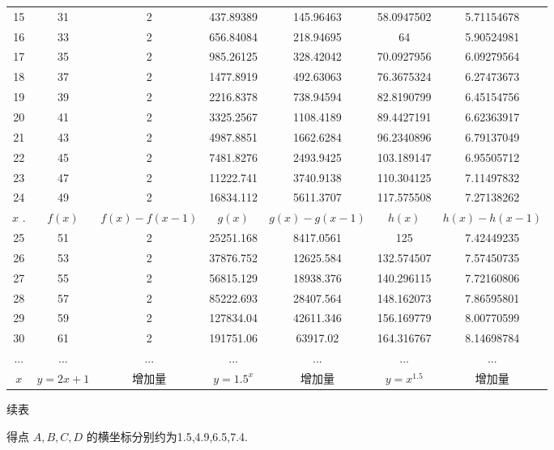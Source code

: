 \documentclass[10pt]{article}
\begin{document}
\begin{center}
{\begin{tabular}{|c|c|c|c|c|c|c|}
\cline{1-7}
15 & 31 & 2 & 437.89389 & 145.96463 & 58.0947502 & 5.71154678 \\
\cline{1-7}
16 & 33 & 2 & 656.84084 & 218.94695 & 64 & 5.90524981 \\
\cline{1-7}
17 & 35 & 2 & 985.26125 & 328.42042 & 70.0927956 & 6.09279564 \\
\cline{1-7}
18 & 37 & 2 & 1477.8919 & 492.63063 & 76.3675324 & 6.27473673 \\
\cline{1-7}
19 & 39 & 2 & 2216.8378 & 738.94594 & 82.8190799 & 6.45154756 \\
\cline{1-7}
20 & 41 & 2 & 3325.2567 & 1108.4189 & 89.4427191 & 6.62363917 \\
\cline{1-7}
21 & 43 & 2 & 4987.8851 & 1662.6284 & 96.2340896 & 6.79137049 \\
\cline{1-7}
22 & 45 & 2 & 7481.8276 & 2493.9425 & 103.189147 & 6.95505712 \\
\cline{1-7}
23 & 47 & 2 & 11222.741 & 3740.9138 & 110.304125 & 7.11497832 \\
\cline{1-7}
24 & 49 & 2 & 16834.112 & 5611.3707 & 117.575508 & 7.27138262 \\
\cline{1-7}
\(x\) . & \(f\left( x\right)\) & \(f\left( x\right)  - f\left( {x - 1}\right)\) & \(g\left( x\right)\) & \(g\left( x\right)  - g\left( {x - 1}\right)\) & \(h\left( x\right)\) & \(h\left( x\right)  - h\left( {x - 1}\right)\) \\
\cline{1-7}
25 & 51 & 2 & 25251.168 & 8417.0561 & 125 & 7.42449235 \\
\cline{1-7}
26 & 53 & 2 & 37876.752 & 12625.584 & 132.574507 & 7.57450735 \\
\cline{1-7}
27 & 55 & 2 & 56815.129 & 18938.376 & 140.296115 & 7.72160806 \\
\cline{1-7}
28 & 57 & 2 & 85222.693 & 28407.564 & 148.162073 & 7.86595801 \\
\cline{1-7}
29 & 59 & 2 & 127834.04 & 42611.346 & 156.169779 & 8.00770599 \\
\cline{1-7}
30 & 61 & 2 & 191751.06 & 63917.02 & 164.316767 & 8.14698784 \\
\cline{1-7}
... & ... & ... & ... & ... & ... & ... \\
\cline{1-7}
\(x\) & \(y = {2x} + 1\) & 增加量 & \(y = {1.5}^{x}\) & 增加量 & \(y = {x}^{1.5}\) & 增加量 \\
\cline{1-7}
\hline
\end{tabular}
}
\end{center}

续表

得点 \(A,B,C,D\) 的横坐标分别约为1.5,4.9,6.5,7.4.
\end{document}
